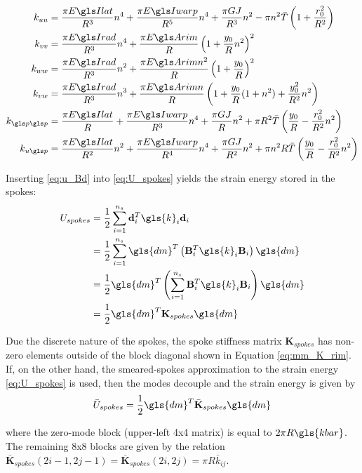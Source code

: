\documentclass[\rootdir/thesis.tex]{subfiles}
\begin{document}
\begin{align*}
k_{uu} &= \frac{\pi \EIl}{R^3}n^4 + \frac{\pi \EIw}{R^5}n^4 + \frac{\pi GJ}{R^3}n^2 - \pi n^2 \bar{T}\left(1 + \frac{r_0^2}{R^2}\right)\\
k_{vv} &= \frac{\pi \EIr}{R^3}n^4 + \frac{\pi \EA}{R}\left(1 + \frac{y_0}{R}n^2 \right)^2\\
k_{ww} &= \frac{\pi \EIr}{R^3}n^2 + \frac{\pi \EA n^2}{R}\left(1 + \frac{y_0}{R} \right)^2\\
k_{vw} &= \frac{\pi \EIr}{R^3}n^3 + \frac{\pi \EA n}{R}\left(1 + \frac{y_0}{R}(1+n^2) + \frac{y_0^2}{R^2}n^2\right)\\
k_{\p\p} &= \frac{\pi \EIl}{R} + \frac{\pi \EIw}{R^3}n^4 + \frac{\pi GJ}{R}n^2 + \pi R^2\bar{T}\left(\frac{y_0}{R} - \frac{r_0^2}{R^2}n^2\right)\\
k_{u\p} &= \frac{\pi \EIl}{R^2}n^2 + \frac{\pi \EIw}{R^4}n^4 + \frac{\pi GJ}{R^2}n^2 + \pi n^2 R \bar{T}\left(\frac{y_0}{R} - \frac{r_0^2}{R^2}n^2\right)
\end{align*}

Inserting \eqref{eq:u_Bd} into \eqref{eq:U_spokes} yields the strain energy stored in the spokes:
\begin{align}
\label{eq:mm_U_spokes}
\begin{split}
U_{spokes} &= \frac{1}{2} \sum_{i=1}^{n_s} \mathbf{d}_i^T \gls{k}_i \mathbf{d}_i\\
&= \frac{1}{2} \sum_{i=1}^{n_s} \gls{dm}^T \left(\mathbf{B}_i^T\gls{k}_i\mathbf{B}_i \right)\gls{dm}\\
&= \frac{1}{2} \gls{dm}^T \left(\sum_{i=1}^{n_s} \mathbf{B}_i^T\gls{k}_i\mathbf{B}_i \right) \gls{dm}\\
&= \frac{1}{2} \gls{dm}^T \mathbf{K}_{spokes} \gls{dm}
\end{split}
\end{align}

Due the discrete nature of the spokes, the spoke stiffness matrix $\mathbf{K}_{spokes}$ has non-zero elements outside of the block diagonal shown in Equation \eqref{eq:mm_K_rim}. If, on the other hand, the smeared-spokes approximation to the strain energy \eqref{eq:U_spokes} is used, then the modes decouple and the strain energy is given by
\begin{equation}
\label{eq:U_spokes_smeared}
\bar{U}_{spokes} = \frac{1}{2} \gls{dm}^T \bar{\mathbf{K}}_{spokes} \gls{dm}
\end{equation}

where the zero-mode block (upper-left 4x4 matrix) is equal to $2\pi R\gls{kbar}$. The remaining 8x8 blocks are given by the relation $\mathbf{\bar{K}}_{spokes}(2i-1, 2j-1) = \mathbf{\bar{K}}_{spokes}(2i, 2j) = \pi R \bar{k}_{ij}$.
\end{document}
